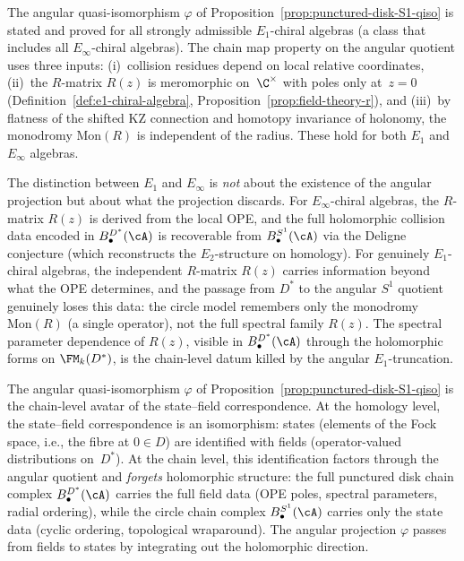 \begin{remark}%
\label{rem:punctured-disk-S1-E1-gap}%
%
%
The angular quasi-isomorphism $\varphi$ of
Proposition~\ref{prop:punctured-disk-S1-qiso} is stated
and proved for all strongly admissible $E_1$-chiral
algebras (a class that includes all $E_\infty$-chiral
algebras). The chain map property on the angular quotient uses three inputs:
(i)~collision residues depend on local relative
coordinates,
(ii)~the $R$-matrix $R(z)$ is meromorphic on~$\C^\times$
with poles only at~$z=0$
(Definition~\ref{def:e1-chiral-algebra},
Proposition~\ref{prop:field-theory-r}), and
(iii)~by flatness of the shifted KZ connection
and homotopy invariance of holonomy, the monodromy
$\mathrm{Mon}(R)$ is independent of the radius.
These hold for both $E_1$ and $E_\infty$ algebras.

The distinction between $E_1$ and $E_\infty$ is
\emph{not} about the existence of the angular projection but about
what the projection discards. For $E_\infty$-chiral
algebras, the $R$-matrix $R(z)$ is derived from the
local OPE, and the full holomorphic collision data
encoded in $B^{D^*}_\bullet(\cA)$ is recoverable from
$B^{S^1}_\bullet(\cA)$ via the Deligne conjecture
(which reconstructs the $E_2$-structure on homology).
For genuinely $E_1$-chiral algebras, the independent
$R$-matrix $R(z)$ carries information beyond what the
OPE determines, and the passage from \(D^*\) to the angular
\(S^1\) quotient genuinely loses this data: the circle model
remembers only the monodromy $\mathrm{Mon}(R)$ (a
single operator), not the full spectral family
$R(z)$. The spectral parameter dependence of
$R(z)$, visible in $B^{D^*}_\bullet(\cA)$ through
the holomorphic forms on $\FM_k(D^*)$, is the
chain-level datum killed by the angular \(E_1\)-truncation.
\end{remark}

\begin{remark}%
\label{rem:state-field-chain-level}%
%
The angular quasi-isomorphism $\varphi$ of
Proposition~\ref{prop:punctured-disk-S1-qiso}
is the chain-level avatar of the state--field
correspondence. At the homology level, the
state--field correspondence is an isomorphism:
states (elements of the Fock space, i.e., the
fibre at $0\in D$) are identified with fields
(operator-valued distributions on~$D^*$). At
the chain level, this identification factors through the angular
quotient and \emph{forgets} holomorphic
structure: the full punctured disk chain complex
$B^{D^*}_\bullet(\cA)$ carries the full field
data (OPE poles, spectral parameters, radial
ordering), while the circle chain complex
$B^{S^1}_\bullet(\cA)$ carries only the state
data (cyclic ordering, topological wraparound).
The angular projection $\varphi$ passes from fields
to states by integrating out the holomorphic
direction.
\end{remark}

